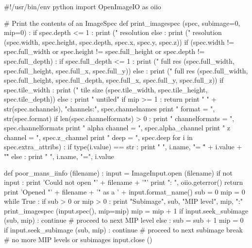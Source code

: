 \begin{tinycode}
#!/usr/bin/env python 
import OpenImageIO as oiio

# Print the contents of an ImageSpec
def print_imagespec (spec, subimage=0, mip=0) :
    if spec.depth <= 1 :
        print ("  resolution %
    else :
        print ("  resolution %
               (spec.width, spec.height, spec.depth, spec.x, spec.y, spec.z))
    if (spec.width != spec.full_width or spec.height != spec.full_height
        or spec.depth != spec.full_depth) :
        if spec.full_depth <= 1 :
            print ("  full res   %
                   (spec.full_width, spec.full_height, spec.full_x, spec.full_y))
        else :
            print ("  full res   %
                   (spec.full_width, spec.full_height, spec.full_depth,
                    spec.full_x, spec.full_y, spec.full_z))
    if spec.tile_width :
        print ("  tile size  %
               (spec.tile_width, spec.tile_height, spec.tile_depth))
    else :
        print "  untiled"
    if mip >= 1 :
        return
    print "  " + str(spec.nchannels), "channels:", spec.channelnames
    print "  format = ", str(spec.format)
    if len(spec.channelformats) > 0 :
        print "  channelformats = ", spec.channelformats
    print "  alpha channel = ", spec.alpha_channel
    print "  z channel = ", spec.z_channel
    print "  deep = ", spec.deep
    for i in spec.extra_attribs) :
        if type(i.value) == str :
            print " ", i.name, "= \"" + i.value + "\""
        else :
            print " ", i.name, "=", i.value


def poor_mans_iinfo (filename) :
    input = ImageInput.open (filename)
    if not input :
        print 'Could not open "' + filename + '"'
        print "\tError: ", oiio.geterror()
        return
    print 'Opened "' + filename + '" as a ' + input.format_name()
    sub = 0
    mip = 0
    while True :
        if sub > 0 or mip > 0 :
            print "Subimage", sub, "MIP level", mip, ":"
        print_imagespec (input.spec(), mip=mip)
        mip = mip + 1
        if input.seek_subimage (sub, mip) :
            continue    # proceed to next MIP level
        else :
            sub = sub + 1
            mip = 0
            if input.seek_subimage (sub, mip) :
                continue    # proceed to next subimage
        break  # no more MIP levels or subimages
    input.close ()
\end{tinycode}


